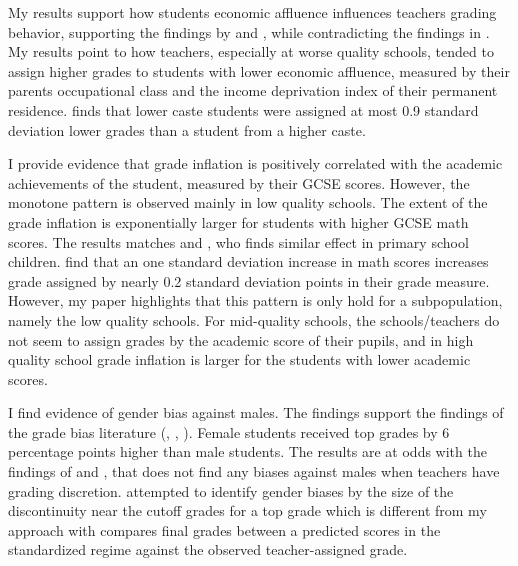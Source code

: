 My results support how students economic affluence influences teachers grading behavior, supporting the findings by \cite{burgess2013} and \cite{d49bd1f0-4cd8-3cd3-b81e-70c074554021}, while contradicting the findings in \cite{hanna2012}. My results point to how teachers, especially at worse quality schools, tended to assign higher grades to students with lower economic affluence, measured by their parents occupational class and the income deprivation index of their permanent residence. \cite{hanna2012} finds that lower caste students were assigned at most 0.9 standard deviation lower grades than a student from a higher caste. 

I provide evidence that grade inflation is positively correlated with the academic achievements of the student, measured by their GCSE scores. However, the monotone pattern is observed mainly in low quality schools. The extent of the grade inflation is exponentially larger for students with higher GCSE math scores. The results matches \cite{cornwell2013} and \cite{d49bd1f0-4cd8-3cd3-b81e-70c074554021}, who finds similar effect in primary school children. \cite{cornwell2013} find that an one standard deviation increase in math scores increases grade assigned by nearly 0.2
standard deviation points in their grade measure. However, my paper highlights that this pattern is only hold for a subpopulation, namely the low quality schools. For mid-quality schools, the schools/teachers do not seem to assign grades by the academic score of their pupils, and in high quality school grade inflation is larger for the students with lower academic scores. 

I find evidence of gender bias against males. The findings support the findings of the grade bias literature (\cite{lavy2009}, \cite{lavy2018}, \cite{cornwell2013}). Female students received top grades by 6 percentage points higher than male students. The results are at odds with the findings of \cite{hanna2012} and \cite{diamond}, that does not find any biases against males when teachers have grading discretion. \cite{diamond} attempted to identify gender biases by the size of the discontinuity near the cutoff grades for a top grade which is different from my approach with compares final grades between a predicted scores in the standardized regime against the observed teacher-assigned grade. 

